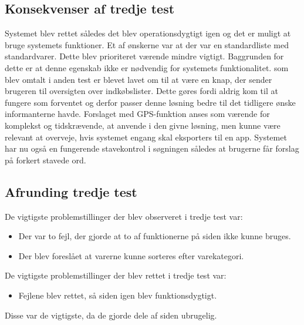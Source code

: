 \subsection{Konsekvenser af tredje test}
Systemet blev rettet således det blev operationsdygtigt igen og det er muligt at bruge systemets funktioner. Et af ønskerne var at der var en standardliste med standardvarer. Dette blev prioriteret værende mindre vigtigt. Baggrunden for dette er at denne egenskab ikke er nødvendig for systemets funktionalitet.
 som blev omtalt i anden test er blevet lavet om til at være en knap, der sender brugeren til oversigten over indkøbslister. Dette gøres fordi  aldrig kom til at fungere som forventet og derfor passer denne løsning bedre til det tidligere ønske informanterne havde.
Forslaget med GPS-funktion anses som værende for komplekst og tidskrævende, at anvende i den givne løsning, men kunne være relevant at overveje, hvis systemet engang skal eksporters til en app.
Systemet har nu også en fungerende stavekontrol i søgningen således at brugerne får forslag på forkert stavede ord.

\subsection{Afrunding tredje test}
De vigtigste problemstillinger der blev observeret i tredje test var:
\begin{itemize}
\item Der var to fejl, der gjorde at to af funktionerne på siden ikke kunne bruges.
\item Der blev foreslået at varerne kunne sorteres efter varekategori.
\end{itemize}
De vigtigste problemstillinger der blev rettet i tredje test var:
\begin{itemize}
\item Fejlene blev rettet, så siden igen blev funktionsdygtigt.
\end{itemize}
Disse var de vigtigste, da de gjorde dele af siden ubrugelig. 
